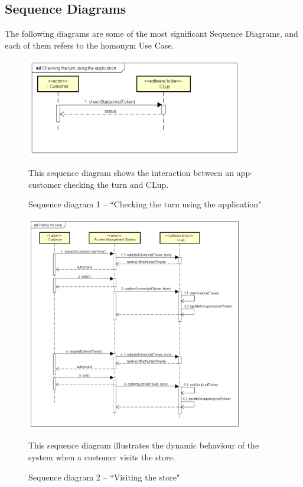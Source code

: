\documentclass[a4paper,oneside,11pt]{book}   %
\newcommand{\captionrasd}[2]{\caption{#1}\par\begin{center}\vspace{-.01\textheight}\small#2.\end{center}}
\begin{document}
    \newpage
    \subsection{Sequence Diagrams}
    The following diagrams are some of the most significant Sequence Diagrams, and each of them refers to the homonym Use Case. 
    
    \begin{figure}[H]
        \centering
        \includegraphics[width=0.85\textwidth, keepaspectratio]{pictures/sequence_diagrams/check_turn_via_app}
        \captionrasd{Sequence diagram 1 -- ``Checking the turn using the application"}{This sequence diagram shows the interaction between an app-customer checking the turn and CLup}
        
        \label{figure:sequence_diagram_1_check_turn_via_app}
    \end{figure}
    
    \begin{figure}[H]
        \centering
        \includegraphics[width=0.85\textwidth, keepaspectratio]{pictures/sequence_diagrams/visiting_the_store}
        \captionrasd{Sequence diagram 2 -- ``Visiting the store"}{This sequence diagram illustrates the dynamic behaviour of the system when a customer visits the store}
        \label{figure:sequence_diagram_2_visiting_store_app}
    \end{figure}
    
\end{document}
